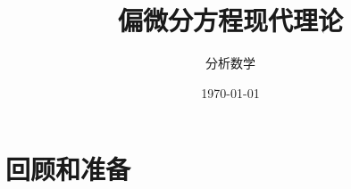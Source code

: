 \documentclass[11pt]{ctexart}[UTF8]
\begin{document}
\title{偏微分方程现代理论}
\author{分析数学}
\date{\today}
\maketitle
\tableofcontents

\newtheorem{theorem}{定理}[section]
\newtheorem{definition}{定义}[section]
\newtheorem{lemma}{引理}[section]
\newtheorem{corollary}{推论}[section]
\newtheorem{proposition}{命题}[section]
\newtheorem{example}{例}[section]
\newtheorem{remark}{注}[section]
\newtheorem{property}{性质}[section]
\newcommand{\supp}{\operatorname{supp}}
\makeatletter
\newcommand{\averageint}{\Xint-}
\def\Xint#1{%
\mathchoice
	{\XXint\displaystyle\textstyle{#1}}%
	{\XXint\textstyle\scriptstyle{#1}}%
	{\XXint\scriptstyle\scriptscriptstyle{#1}}%
	{\XXint\scriptscriptstyle\scriptscriptstyle{#1}}%
	\!\int
}
\def\XXint#1#2#3{%
\setbox0=\hbox{$#1{#2#3}{\int}$}%
\vcenter{\hbox{$#2#3$}}\kern-.52\wd0
}
\makeatother

\newpage
\section{回顾和准备}
\end{document}
